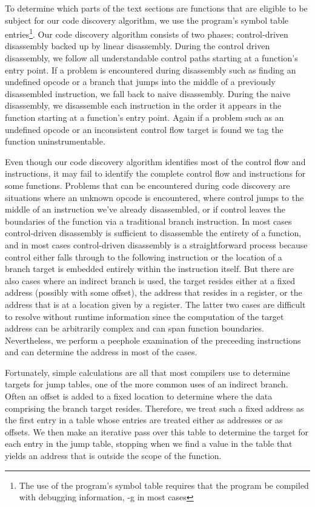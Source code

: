 To determine which parts of the text sections are functions that are eligible to be subject for our code discovery algorithm, 
we use the program's symbol table entries\footnote{The use of the program's symbol table requires that the program be compiled
with debugging information, -g in most cases}. Our code discovery algorithm
consists of two phases; control-driven disassembly backed up by linear disassembly. During the control driven disassembly, 
we follow all understandable control paths starting at a function's entry point. If a problem is encountered during disassembly such as 
finding an undefined opcode or a branch that jumps into the middle of a previously disassembled instruction, 
we fall back to naive disassembly. During the naive disassembly, we disassemble each instruction in the order it appears in the
function starting at a function's entry point. Again if a problem such as an undefined opcode or an inconsistent control flow target 
is found we tag the function uninstrumentable.  

Even though our code discovery algorithm identifies most of the control flow and instructions, it may fail to 
identify the complete control flow and instructions for some functions.  Problems that can be encountered during code discovery
are situations where an unknown opcode is encountered, where control jumps to the
middle of an instruction we've already disassembled, or if control leaves the boundaries of the function via a traditional branch
instruction. In most
cases control-driven disassembly is sufficient to disassemble the entirety of a function, and in most cases control-driven
disassembly is a straightforward process because control either falls through to the following instruction 
or the location of a branch target is embedded entirely within the instruction itself. But there are also cases
where an indirect branch is used, the target resides either at a fixed address (possibly with some offset),
the address that resides in a register, or the address that is at a location given by a register. The latter two cases are difficult to resolve
without runtime information since the computation of the target address can be arbitrarily complex and can span function
boundaries. Nevertheless, we perform a peephole examination of the preceeding instructions and can determine 
the address in most of the cases.

Fortunately, simple calculations are all that most compilers use to determine targets for jump tables, one of the more common
uses of an indirect branch. Often an offset is added to a fixed location to determine where the data comprising the branch target
resides. Therefore, we treat such a fixed address as the first entry in a table whose entries are treated either as addresses or as offsets.
We then make an iterative pass over this table to determine the target for each entry in the jump table, stopping when we find a value in the
table that yields an address that is outside the scope of the function.

